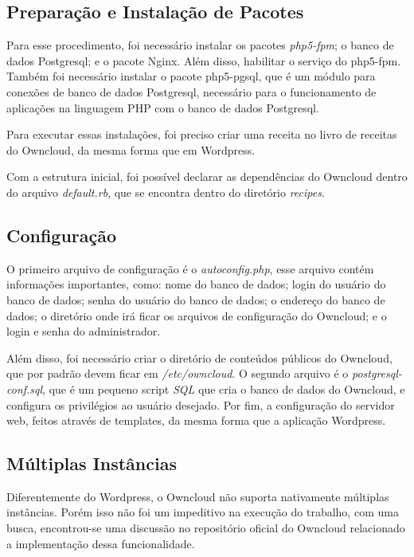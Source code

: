 \subsection{Preparação e Instalação de Pacotes}

Para esse procedimento, foi necessário instalar os pacotes \textit{php5-fpm}; o banco
de dados Postgresql; e o pacote Nginx. Além disso, habilitar o serviço do php5-fpm. 
Também foi necessário instalar o pacote php5-pgsql, que é um módulo para
conexões de banco de dados Postgresql, necessário para o funcionamento de
aplicações na linguagem PHP com o banco de dados Postgresql.

Para executar essas instalações, foi preciso criar uma receita no livro de receitas
do Owncloud, da mesma forma que em Wordpress.

Com a estrutura inicial, foi possível declarar as dependências do Owncloud
dentro do arquivo \textit{default.rb}, que se encontra dentro do diretório 
\textit{recipes}.
 
\subsection{Configuração}

O primeiro arquivo de configuração é o \textit{autoconfig.php}, esse arquivo
contém informações importantes, como: nome do banco de dados;
login do usuário do banco de dados; senha do usuário do banco de dados; o endereço 
do banco de dados; o diretório
onde irá ficar os arquivos de configuração do Owncloud; e o login e senha
do administrador. 

Além disso, foi necessário criar o diretório de conteúdos públicos do Owncloud, que por
padrão devem ficar em \textit{/etc/owncloud}. O segundo arquivo é o 
\textit{postgresql-conf.sql}, que é um pequeno script \textit{SQL} que cria o 
banco de dados do Owncloud, e configura os
privilégios ao usuário desejado. Por fim, a configuração do servidor web, feitos
através de templates, da mesma forma que a aplicação Wordpress.

\subsection{Múltiplas Instâncias}

Diferentemente do Wordpress, o Owncloud não suporta nativamente múltiplas instâncias. 
Porém isso não foi um impeditivo na execução do trabalho, com uma busca, encontrou-se uma 
discussão no repositório oficial do Owncloud relacionado a implementação dessa 
funcionalidade. 

